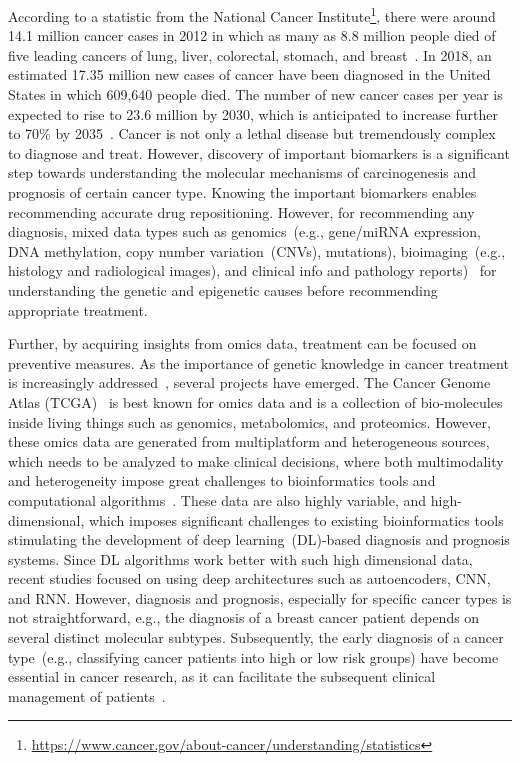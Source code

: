 \hspace*{3.5mm} According to a statistic from the National Cancer Institute\footnote{\url{https://www.cancer.gov/about-cancer/understanding/statistics}}, there were around 14.1 million cancer cases in 2012 in which as many as 8.8 million people died of five leading cancers of lung, liver, colorectal, stomach, and breast~\cite{stat}. In 2018, an estimated 17.35 million new cases of cancer have been diagnosed in the United States in which 609,640 people died. The number of new cancer cases per year is expected to rise to 23.6 million by 2030, which is anticipated to increase further to 70\% by 2035~\cite{71Torre}. Cancer is not only a lethal disease but tremendously complex to diagnose and treat. However, discovery of important biomarkers is a significant step towards understanding the molecular mechanisms of carcinogenesis and prognosis of certain cancer type. Knowing the important biomarkers enables recommending accurate drug repositioning. However, for recommending any diagnosis, mixed data types such as genomics~(e.g., gene/miRNA expression, DNA methylation, copy number variation~(CNVs), mutations), bioimaging~(e.g., histology and radiological images), and clinical info and pathology reports)~\cite{22Ding, 23Zheng} for understanding the genetic and epigenetic causes before recommending appropriate treatment. 

\hspace*{3.5mm} Further, by acquiring insights from omics data, treatment can be focused on preventive measures. As the importance of genetic knowledge in cancer treatment is increasingly addressed~\cite{15Wu}, several projects have emerged. The Cancer Genome Atlas (TCGA)~\cite{tomczak2015cancer} is best known for omics data and is a collection of bio-molecules inside living things such as genomics, metabolomics, and proteomics. However, these omics data are generated from multiplatform and heterogeneous sources, which needs to be analyzed to make clinical decisions, where both multimodality and heterogeneity impose great challenges to bioinformatics tools and computational algorithms~\cite{karimACCESS2019,karimBIB2019}. 
These data are also highly variable, and high-dimensional, which imposes significant challenges to existing bioinformatics tools stimulating the development of deep learning~(DL)-based diagnosis and prognosis systems. Since DL algorithms work better with such high dimensional data, recent studies focused on using deep architectures such as autoencoders, CNN, and RNN. However, diagnosis and prognosis, especially for specific cancer types is not straightforward, e.g., the diagnosis of a breast cancer patient depends on several distinct molecular subtypes. Subsequently, the early diagnosis of a cancer type~(e.g., classifying cancer patients into high or low risk groups) have become essential in cancer research, as it can facilitate the subsequent clinical management of patients~\cite{kourou2015machine}. 

